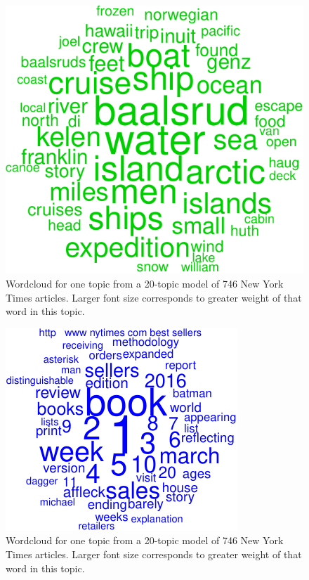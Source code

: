 \documentclass[12pt,]{article}
\begin{document}
\begin{figure}
\includegraphics[width=\textwidth]{lda-tutorial-2016_files/figure-latex/wordcloud1-2.pdf}
\caption{Wordcloud for one topic from a 20-topic model of 746 New York Times articles. Larger font size corresponds to greater weight of that word in this topic.\label{fig:wc2}}
\end{figure}

\begin{figure}
\includegraphics[width=\textwidth]{lda-tutorial-2016_files/figure-latex/wordcloud1-3.pdf}
\caption{Wordcloud for one topic from a 20-topic model of 746 New York Times articles. Larger font size corresponds to greater weight of that word in this topic.\label{fig:wc3}}
\end{figure}
\end{document}
